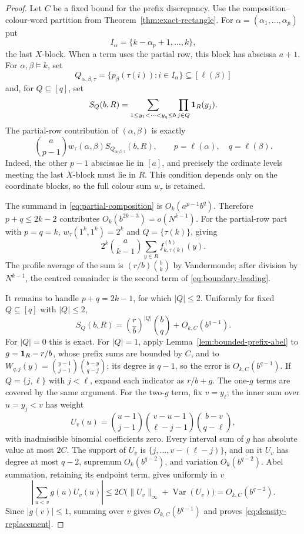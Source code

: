 \begin{proof}
Let $C$ be a fixed bound for the prefix discrepancy.  Use the composition--colour-word
partition from Theorem~\ref{thm:exact-rectangle}.  For
$\alpha=(\alpha_1,\ldots,\alpha_p)$ put
\[
 I_\alpha=\{k-\alpha_p+1,\ldots,k\},
\]
the last $X$-block.  When a term uses the partial row, this block has
abscissa $a+1$.  For $\alpha,\beta\vDash k$, set
\[
 Q_{\alpha,\beta,\tau}
 =\{p_\beta(\tau(i)):i\in I_\alpha\}\subseteq[\ell(\beta)]
\]
and, for $Q\subseteq[q]$, set
\[
 S_Q(b,R)=\sum_{1\le y_1<\cdots<y_q\le b}
               \prod_{j\in Q}{\bf1}_R(y_j).
\]
The partial-row contribution of $(\alpha,\beta)$ is exactly
\begin{equation}\label{eq:partial-composition}
 \binom a{p-1}w_\tau(\alpha,\beta)
 S_{Q_{\alpha,\beta,\tau}}(b,R),
 \qquad p=\ell(\alpha),\quad q=\ell(\beta).
\end{equation}
Indeed, the other $p-1$ abscissae lie in $[a]$, and precisely the ordinate
levels meeting the last $X$-block must lie in $R$.  This condition depends
only on the coordinate blocks, so the full colour sum $w_\tau$ is retained.

The summand in \eqref{eq:partial-composition} is
$O_k(a^{p-1}b^q)$.  Therefore $p+q\le2k-2$ contributes
$O_k(b^{2k-3})=o(N^{k-1})$.  For the partial-row part with $p=q=k$,
$w_\tau(1^k,1^k)=2^k$ and $Q=\{\tau(k)\}$, giving
\[
 2^k\binom a{k-1}\sum_{y\in R}f_{k,\tau(k)}^{(b)}(y).
\]
The profile average of the sum is $(r/b)\binom bk$ by Vandermonde;
after division by $N^{k-1}$, the centred remainder is the
second term of \eqref{eq:boundary-leading}.

It remains to handle $p+q=2k-1$, for which $|Q|\le2$.  Uniformly for fixed
$Q\subseteq[q]$ with $|Q|\le2$,
\begin{equation}\label{eq:density-replacement}
 S_Q(b,R)=\left(\frac rb\right)^{|Q|}\binom bq
          +O_{k,C}(b^{q-1}).
\end{equation}
For $|Q|=0$ this is exact.  For $|Q|=1$, apply
Lemma~\ref{lem:bounded-prefix-abel} to $g={\bf1}_R-r/b$, whose prefix sums
are bounded by $C$, and to
$W_{q,j}(y)=\binom{y-1}{j-1}\binom{b-y}{q-j}$; its degree is $q-1$, so
the error is $O_{k,C}(b^{q-1})$.  If $Q=\{j,\ell\}$ with $j<\ell$,
expand each indicator as $r/b+g$.  The one-$g$ terms are covered by the
same argument.  For the two-$g$ term, fix $v=y_\ell$; the inner sum over
$u=y_j<v$ has weight
\[
 U_v(u)=\binom{u-1}{j-1}
        \binom{v-u-1}{\ell-j-1}
        \binom{b-v}{q-\ell},
\]
with inadmissible binomial coefficients zero.  Every interval sum of $g$
has absolute value at most $2C$.  The support of $U_v$ is
$\{j,\ldots,v-(\ell-j)\}$, and on it $U_v$ has degree at most $q-2$,
supremum $O_k(b^{q-2})$, and variation $O_k(b^{q-2})$.  Abel summation,
retaining its endpoint term, gives uniformly in $v$
\[
 \left|\sum_{u<v}g(u)U_v(u)\right|
 \le 2C\bigl(\lVert U_v\rVert_\infty+\operatorname{Var}(U_v)\bigr)
 =O_{k,C}(b^{q-2}).
\]
Since $|g(v)|\le1$, summing over $v$ gives $O_{k,C}(b^{q-1})$ and proves
\eqref{eq:density-replacement}.


\end{proof}
